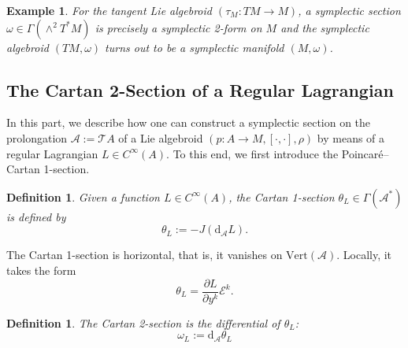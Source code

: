 \documentclass[12pt,letterpaper]{article}
\newcommand{\A}{\mathscr{A}}
\newtheorem{definition}[theorem]{Definition}
\newtheorem{example}[theorem]{Example}
\numberwithin{equation}{section}
\begin{document}
\begin{example}
For the tangent Lie algebroid $(\tau_M: TM \rightarrow M) $, a symplectic section $\omega \in \Gamma(\wedge^2 T^*M) $ 
is precisely a symplectic 2-form on $M$ and the symplectic algebroid $(TM, \omega)$ turns out to be a symplectic manifold $(M, \omega)$. 
\end{example}


\subsection{The Cartan 2-Section of a Regular Lagrangian}

In this part, we describe how one can construct a symplectic section on the prolongation $\A:=\mathcal{T}A$ of a Lie algebroid $(p: A \rightarrow M, [ \cdot, \cdot ], \rho)$ 
by means of a regular Lagrangian $L\in C^\infty(A)$. 
To this end, we first introduce the Poincaré--Cartan 1-section.

\begin{definition}
Given a function $ L \in C^\infty(A)$, the \emph{Cartan 1-section} $\theta_L\in\Gamma(\A^*)$ is defined by
\begin{equation*}
\theta_L := -J(\mathrm{d}_{\A}L).
\end{equation*}
\end{definition}

The Cartan 1-section is horizontal, that is, it vanishes on $\mathrm{Vert}( \A )$. 
Locally, it takes the form
\begin{equation*}
\theta_L = \frac{\partial L}{ \partial y^k} \mathcal{E}^k.
\end{equation*}

\begin{definition}
The Cartan 2-section is the differential of $\theta_L$:
\begin{equation}\label{cartantwo}
\omega_L := \mathrm{d}_{\A}\theta_L
\end{equation}
\end{definition}
\end{document}
